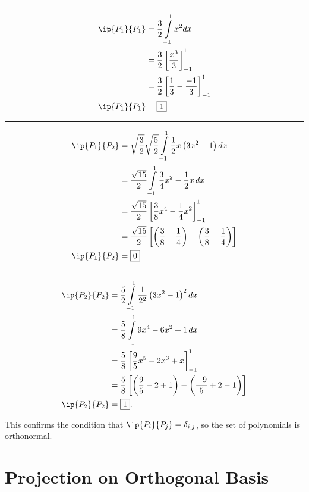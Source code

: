 \documentclass{hw-template}
\begin{document}
\hrule
\begin{equation}
    \begin{aligned}
    \ip{P_1}{P_1} &= \frac{3}{2}\int\limits_{-1}^{1} x^2 dx\\
     &= \frac{3}{2} \left[ \frac{x^3}{3} \right]_{-1}^1\\
    &= \frac{3}{2} \left[ \frac{1}{3} - \frac{-1}{3} \right]_{-1}^1\\
    \ip{P_1}{P_1} &= \boxed{1}
\end{aligned}
\end{equation}
\hrule
\begin{equation}
    \begin{aligned}
    \ip{P_1}{P_2} &= \sqrt{\frac{3}{2}}\sqrt{\frac{5}{2}}\int\limits_{-1}^{1} \frac{1}{2}x  \left(3x^2 - 1 \right)dx\\
    &= \frac{\sqrt{15}}{2}\int\limits_{-1}^{1} \frac{3}{4}x^2 - \frac{1}{2}x \, dx\\
    &= \frac{\sqrt{15}}{2} \left[ \frac{3}{8}x^4 - \frac{1}{4}x^2 \right]_{-1}^{1}\\
    &= \frac{\sqrt{15}}{2} \left[ \left(\frac{3}{8} - \frac{1}{4} \right) - \left( \frac{3}{8} - \frac{1}{4}\right) \right]\\
    \ip{P_1}{P_2} &= \boxed{0}
\end{aligned}
\end{equation}
\hrule
\begin{equation}
    \begin{aligned}
    \ip{P_2}{P_2} &= \frac{5}{2} \int\limits_{-1}^{1} \frac{1}{2^2} \left(3x^2 - 1 \right)^2dx\\
    &= \frac{5}{8} \int\limits_{-1}^{1}  9x^4 - 6x^2 + 1\,dx\\
    &= \frac{5}{8} \left[ \frac{9}{5}x^5 - 2x^3 + x \right]_{-1}^{1}\\
    &= \frac{5}{8} \left[ \left(\frac{9}{5} - 2 + 1 \right) -  \left(\frac{-9}{5} + 2 - 1 \right) \right]\\
    \ip{P_2}{P_2} &= \boxed{1}.
\end{aligned}
\end{equation}

This confirms the condition that $\ip{P_i}{P_j}  = \delta_{i, j}$, so the set of polynomials is orthonormal.

\section{Projection on Orthogonal Basis}
\end{document}
